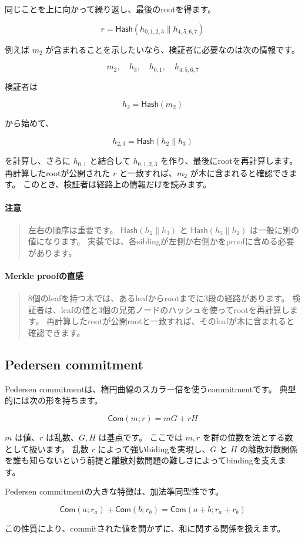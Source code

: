 \documentclass[a4paper,11pt]{ltjsarticle}
\newcommand{\Com}{\mathsf{Com}}
\newcommand{\Hash}{\mathsf{Hash}}
\newenvironment{examplebox}[1]{%
  \paragraph*{#1}\begin{quote}
}{%
  \end{quote}
}
\newenvironment{warnbox}{%
  \paragraph*{注意}\begin{quote}
}{%
  \end{quote}
}
\begin{document}
同じことを上に向かって繰り返し、最後のrootを得ます。

\[
  r=\Hash(h_{0,1,2,3}\|h_{4,5,6,7})
\]

例えば \(m_2\) が含まれることを示したいなら、検証者に必要なのは次の情報です。

\[
  m_2,\quad h_3,\quad h_{0,1},\quad h_{4,5,6,7}
\]

検証者は

\[
  h_2=\Hash(m_2)
\]

から始めて、

\[
  h_{2,3}=\Hash(h_2\|h_3)
\]

を計算し、さらに \(h_{0,1}\) と結合して \(h_{0,1,2,3}\) を作り、最後にrootを再計算します。
再計算したrootが公開された \(r\) と一致すれば、\(m_2\) が木に含まれると確認できます。
このとき、検証者は経路上の情報だけを読みます。

\begin{warnbox}
左右の順序は重要です。
\(\Hash(h_2\|h_3)\) と \(\Hash(h_3\|h_2)\) は一般に別の値になります。
実装では、各siblingが左側か右側かをproofに含める必要があります。
\end{warnbox}

\begin{examplebox}{Merkle proofの直感}
8個のleafを持つ木では、あるleafからrootまでに3段の経路があります。
検証者は、leafの値と3個の兄弟ノードのハッシュを使ってrootを再計算します。
再計算したrootが公開rootと一致すれば、そのleafが木に含まれると確認できます。
\end{examplebox}

\subsection{Pedersen commitment}

Pedersen commitmentは、楕円曲線のスカラー倍を使うcommitmentです。
典型的には次の形を持ちます。

\[
  \Com(m;r)=mG+rH
\]

\(m\) は値、\(r\) は乱数、\(G,H\) は基点です。
ここでは \(m,r\) を群の位数を法とする数として扱います。
乱数 \(r\) によって強いhidingを実現し、\(G\) と \(H\) の離散対数関係を誰も知らないという前提と離散対数問題の難しさによってbindingを支えます。

Pedersen commitmentの大きな特徴は、加法準同型性です。

\[
  \Com(a;r_a)+\Com(b;r_b)=\Com(a+b;r_a+r_b)
\]

この性質により、commitされた値を開かずに、和に関する関係を扱えます。
\end{document}
